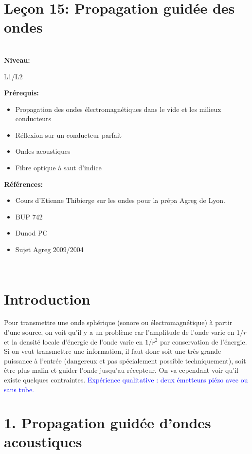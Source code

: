 \documentclass[french, a4paper, 10pt, twocolumn, landscape]{article}
\begin{document}
\section*{Leçon 15: Propagation guidée des ondes}

\hrulefill\\
\noindent\textbf{\large Niveau:}\medskip

L1/L2\medskip

\noindent\textbf{\large Prérequis:} \medskip 

\begin{itemize}
	\item Propagation des ondes électromagnétiques dans le vide et les milieux conducteurs
	\item Réflexion sur un conducteur parfait
	\item Ondes acoustiques
	\item Fibre optique à saut d’indice
\end{itemize}


\noindent\textbf{\large Références:} \medskip
\begin{itemize}
	\item Cours d’Etienne Thibierge sur les ondes pour la prépa Agreg de Lyon.
	\item BUP 742
	\item Dunod PC
	\item Sujet Agreg 2009/2004
\end{itemize}

\hrulefill\\

\section*{Introduction}

Pour transmettre une onde sphérique (sonore ou électromagnétique) à partir d'une source, on voit qu'il y a un problème car l'amplitude de l'onde varie en $1/r$ et la densité locale d'énergie de l'onde varie en $1/r^2$ par conservation de l'énergie. Si on veut transmettre une information, il faut donc soit une très grande puissance à l'entrée (dangereux et pas spécialement possible techniquement), soit être plus malin et guider l'onde jusqu'au récepteur. On va cependant voir qu'il existe quelques contraintes.
\textcolor{blue}{Expérience qualitative : deux émetteurs piézo avec ou sans tube.}

\section*{1. Propagation guidée d'ondes acoustiques}
\end{document}
